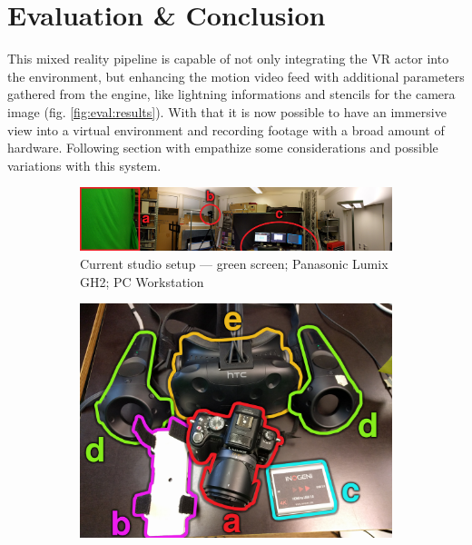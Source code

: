 %
\chapter{Evaluation \& Conclusion}

This mixed reality pipeline is capable of not only integrating the VR actor 
into the environment, but enhancing the motion video feed with additional 
parameters gathered from the engine, like lightning informations and stencils 
for the camera image (fig. \ref{fig:eval:results}). With that it is now 
possible to have an immersive view into a virtual environment and recording 
footage with a broad amount of hardware. Following section with empathize some 
considerations and possible variations with this system.

\begin{figure}[htbp]
	\caption{Results}
	\label{fig:eval:results}
	\centering
	\begin{subfigure}[t]{\textwidth}
		\centering
		\includegraphics[width=\textwidth]{gfx/results/pano.png}
		\caption{Current studio setup ---  green screen; 
			 Panasonic Lumix GH2;  PC Workstation}
	\end{subfigure}
	\begin{subfigure}[t]{.49\textwidth}
		\centering
		\includegraphics[width=\textwidth]{gfx/results/camera.png}

\end{subfigure}
\end{figure}
